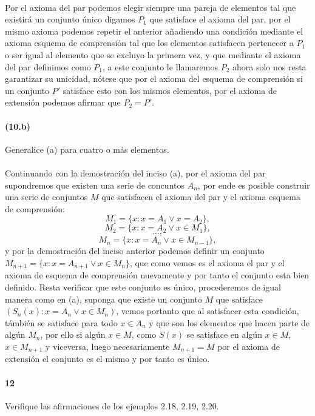 \documentclass{article}
\begin{document}
	\paragraph{} Por el axioma del par podemos elegir siempre una pareja de elementos tal que existirá un conjunto único digamos $P_1$ que satisface el axioma del par, por el mismo axioma podemos repetir el anterior añadiendo  una condición mediante el axioma esquema de comprensión tal que los elementos satisfacen pertenecer a $P_1$ o ser igual al elemento que se excluyo la primera vez, y que mediante el axioma del par definimos como $P_1$, a este conjunto le llamaremos $P_2$ ahora solo nos resta garantizar su unicidad, nótese que por el axioma del esquema de comprensión si un conjunto $P'$ satisface esto con los mismos elementos, por el axioma de extensión podemos afirmar que $P_2 = P'$.
	\paragraph{(10.b)}  Generalice (a) para cuatro o más elementos.
	\paragraph{} Continuando con la demostración del inciso (a), por el axioma del par supondremos que existen una serie de concuntos $A_n$, por ende es posible construir una serie de conjuntos $M$ que satisfacen el axioma del par y el axioma esquema de comprensión:
	$$M_1 = \{x: x = A_1 \lor x = A_2\},$$
	$$M_2 = \{x: x = A_2 \lor x \in M_1\},$$
	$$\dots,$$
	$$M_n = \{x: x = A_n \lor x \in M_{n-1}\},$$
	y por la demostración del inciso anterior podemos definir un conjunto $M_{n+1} = \{x: x = A_{n+1} \lor x \in M_{n}\}$, que como vemos es el axioma el par y el axioma de esquema de comprensión nuevamente y por tanto el conjunto esta bien definido. Resta verificar que este conjunto es único, procederemos de igual manera como en (a), suponga que existe un conjunto $M$ que satisface $(S_n(x):x = A_n \lor x \in M_n)$, vemos portanto que al satisfacer esta condición, támbién se satisface para todo $x \in A_n$ y que son los elementos que hacen parte de algún $M_n$, por ello si algún $x \in M$, como $S(x)$ se satisface en algún $x \in M$, $x \in M_{n+1}$ y viceversa, luego necesariamente $M_{n+1} = M$ por el axioma de extensión el conjunto es el mismo y por tanto es único.
	\paragraph{12} Verifique las  afirmaciones de los ejemplos 2.18, 2.19, 2.20.
\end{document}
